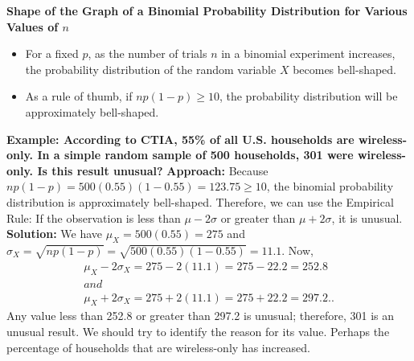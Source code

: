 \documentclass{report}
\begin{document}
      \bigbreak \noindent \bigbreak \noindent 
      \textbf{Shape of the Graph of a Binomial Probability Distribution for Various Values of $n $ }
      \bigbreak \noindent 
      \begin{itemize}
          \item For a fixed $p$, as the number of trials $n $ in a binomial experiment increases, the probability distribution of the random variable $X$ becomes bell-shaped.
          \item As a rule of thumb, if $np(1−p) \geq 10$, the probability distribution will be approximately bell-shaped.
      \end{itemize}
      \bigbreak \noindent 

      \pagebreak 
      \bigbreak \noindent 
      \begin{mdframed}
        \textbf{Example: According to CTIA, 55\% of all U.S. households are wireless-only. In a simple random sample of 500 households, 301 were wireless-only. Is this result unusual?}
        \bigbreak \noindent 
        \textbf{Approach:}
        \bigbreak \noindent 
        Because $np(1-p) = 500(0.55)(1-0.55) = 123.75 \geq 10$, the binomial probability distribution is approximately bell-shaped. Therefore, we can use the Empirical Rule: If the observation is less than $\mu - 2\sigma$ or greater than $\mu + 2\sigma$, it is unusual.
        \bigbreak \noindent 
        \textbf{Solution:}
        We have $\mu_X = 500(0.55) = 275$ and $\sigma_X = \sqrt{np(1-p)} = \sqrt{500(0.55)(1-0.55)} = 11.1$. Now,
        \begin{align*}
            \mu_X - 2\sigma_X = 275 - 2(11.1) = 275 - 22.2 = 252.8\\ and\\ \mu_X + 2\sigma_X = 275 + 2(11.1) = 275 + 22.2 = 297.2.
        .\end{align*}
        \bigbreak \noindent 
        Any value less than 252.8 or greater than 297.2 is unusual; therefore, 301 is an unusual result. We should try to identify the reason for its value. Perhaps the percentage of households that are wireless-only has increased.




        
      \end{mdframed}
\end{document}
